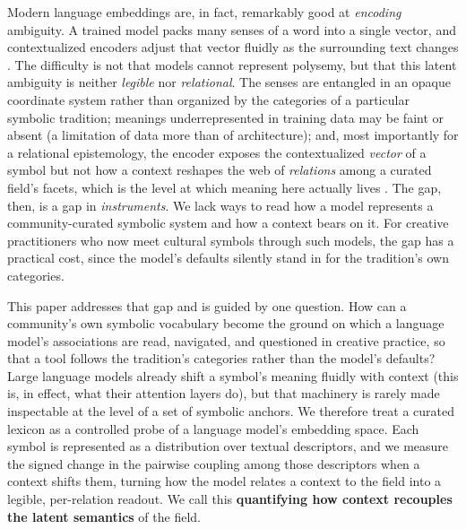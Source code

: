 \documentclass[final,creativeai]{article}
\begin{document}
Modern language embeddings are, in fact, remarkably good at \emph{encoding} ambiguity. A trained model packs many senses of a word into a single vector, and contextualized encoders adjust that vector fluidly as the surrounding text changes \cite{haber_polysemyevidence_2024, loureiro_analysis_2021}. The difficulty is not that models cannot represent polysemy, but that this latent ambiguity is neither \emph{legible} nor \emph{relational}. The senses are entangled in an opaque coordinate system rather than organized by the categories of a particular symbolic tradition; meanings underrepresented in training data may be faint or absent (a limitation of data more than of architecture); and, most importantly for a relational epistemology, the encoder exposes the contextualized \emph{vector} of a symbol but not how a context reshapes the web of \emph{relations} among a curated field's facets, which is the level at which meaning here actually lives \cite{ferrari_identification_2018}. The gap, then, is a gap in \emph{instruments}. We lack ways to read how a model represents a community-curated symbolic system and how a context bears on it. For creative practitioners who now meet cultural symbols through such models, the gap has a practical cost, since the model's defaults silently stand in for the tradition's own categories.

This paper addresses that gap and is guided by one question. How can a community's own symbolic vocabulary become the ground on which a language model's associations are read, navigated, and questioned in creative practice, so that a tool follows the tradition's categories rather than the model's defaults? Large language models already shift a symbol's meaning fluidly with context (this is, in effect, what their attention layers do), but that machinery is rarely made inspectable at the level of a set of symbolic anchors. We therefore treat a curated lexicon as a controlled probe of a language model's embedding space. Each symbol is represented as a distribution over textual descriptors, and we measure the signed change in the pairwise coupling among those descriptors when a context shifts them, turning how the model relates a context to the field into a legible, per-relation readout. We call this \textbf{quantifying how context recouples the latent semantics} of the field.
\end{document}
